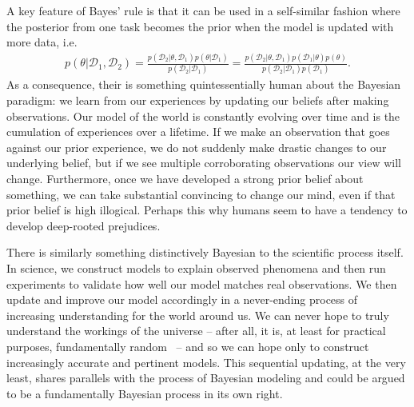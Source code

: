 A key feature of Bayes' rule is that it can be used in a self-similar fashion where the posterior from
one task becomes the prior when the model is updated with more data, i.e.
\begin{align}
	\label{eq:bayes:repeat-bayes}
p(\theta | \mathcal{D}_1, \mathcal{D}_2) = 
\frac{p(\mathcal{D}_2 | \theta, \mathcal{D}_1)p(\theta | \mathcal{D}_1)}{p(\mathcal{D}_2 | \mathcal{D}_1)} =
\frac{p(\mathcal{D}_2 | \theta, \mathcal{D}_1)p(\mathcal{D}_1 | \theta) p(\theta)}
{p(\mathcal{D}_2 | \mathcal{D}_1) p(\mathcal{D}_1)} .
\end{align}
As a consequence, their is something quintessentially human about the Bayesian paradigm: we learn
from our experiences by updating our beliefs after making observations.  Our model of the world
is constantly evolving over time and is the cumulation of experiences over a lifetime.  
If we make an observation that goes against our prior experience, we do not suddenly make
drastic changes to our underlying belief, but if we see multiple corroborating observations our
view will change.
Furthermore, once we have developed
a strong prior belief about something, we can take substantial convincing to change our mind, even
if that prior belief is high illogical.  Perhaps this why humans seem to have a tendency to develop
deep-rooted prejudices.

There is similarly something distinctively Bayesian to the scientific process itself.  In science, we construct models
to explain observed phenomena and then run experiments to validate how well our model matches
real observations.  We then update and improve our model accordingly in a never-ending process of
increasing understanding for the world around us.  We can never hope to truly understand the workings
of the universe  -- after all, it is, at least for practical purposes, fundamentally random~\citep{rainforth2013random} 
-- and so we can hope only to construct increasingly accurate and pertinent models.
This sequential updating, at the very least, shares parallels with the process of Bayesian modeling
and could be argued to be a fundamentally Bayesian process in its own right.


